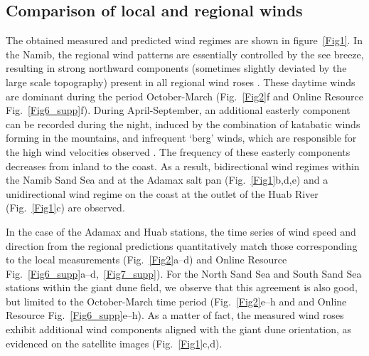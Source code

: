 \subsection{Comparison of local and regional winds}
\label{section_data_feedback}
The obtained measured and predicted wind regimes are shown in figure~\ref{Fig1}. In the Namib, the regional wind patterns are essentially controlled by the see breeze, resulting in strong northward components (sometimes slightly deviated by the large scale topography) present in all regional wind roses \citep{lancaster1985}. These daytime winds are dominant during the period October-March (Fig.~\ref{Fig2}f and Online Resource Fig.~\ref{Fig6_supp}f). During April-September, an additional easterly component can be recorded during the night, induced by the combination of katabatic winds forming in the mountains, and infrequent `berg' winds, which are responsible for the high wind velocities observed \citep{lancaster1984}. The frequency of these easterly components decreases from inland to the coast. As a result, bidirectional wind regimes within the Namib Sand Sea and at the Adamax salt pan (Fig.~\ref{Fig1}b,d,e) and a unidirectional wind regime on the coast at the outlet of the Huab River (Fig.~\ref{Fig1}c) are observed.

In the case of the Adamax and Huab stations, the time series of wind speed and direction from the regional predictions quantitatively match those corresponding to the local measurements (Fig.~\ref{Fig2}a--d) and Online Resource Fig.~\ref{Fig6_supp}a--d,~\ref{Fig7_supp}). For the North Sand Sea and South Sand Sea stations within the giant dune field, we observe that this agreement is also good, but limited to the October-March time period (Fig.~\ref{Fig2}e--h and and Online Resource Fig.~\ref{Fig6_supp}e--h). As a matter of fact, the measured wind roses exhibit additional wind components aligned with the giant dune orientation, as evidenced on the satellite images (Fig.~\ref{Fig1}c,d).

